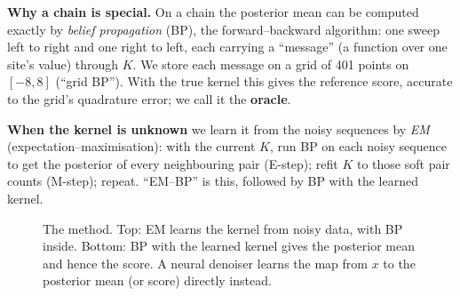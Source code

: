 \documentclass[11pt,a4paper]{article}
\begin{document}
\textbf{Why a chain is special.} On a chain the posterior mean can be computed exactly by \emph{belief propagation} (BP), the
forward--backward algorithm: one sweep left to right and one right to left, each carrying a ``message'' (a function over one
site's value) through $K$. We store each message on a grid of 401 points on $[-8,8]$ (``grid BP''). With the true kernel this
gives the reference score, accurate to the grid's quadrature error; we call it the \textbf{oracle}.

\textbf{When the kernel is unknown} we learn it from the noisy sequences by \emph{EM} (expectation--maximisation): with the
current $K$, run BP on each noisy sequence to get the posterior of every neighbouring pair (E-step); refit $K$ to those soft pair
counts (M-step); repeat. ``EM--BP'' is this, followed by BP with the learned kernel.

\begin{figure}[!htbp]\centering
{}
\caption{The method. Top: EM learns the kernel from noisy data, with BP inside. Bottom: BP with the learned kernel gives the
posterior mean and hence the score. A neural denoiser learns the map from $x$ to the posterior mean (or score) directly instead.}
\end{figure}
\end{document}
